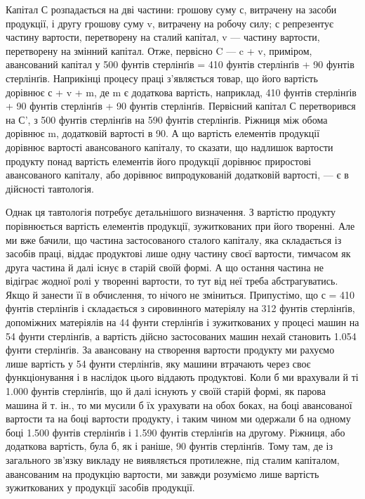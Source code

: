 Капітал С розпадається на дві частини: грошову суму с, витрачену на засоби продукції, і другу
грошову суму v, витрачену на робочу силу; с репрезентує частину вартости, перетворену на сталий
капітал, v — частину вартости, перетворену на змінний капітал. Отже, первісно C — c + v, приміром,
авансований капітал у 500 фунтів стерлінґів = 410 фунтів стерлінґів + 90 фунтів стерлінґів.
Наприкінці процесу праці з’являється товар, що його вартість дорівнює с + v + m, де m є додаткова
вартість, наприклад, 410 фунтів стерлінґів + 90 фунтів стерлінґів + 90 фунтів стерлінґів. Первісний
капітал С перетворився на С',
з 500 фунтів стерлінґів на 590 фунтів стерлінґів. Ріжниця між обома дорівнює m, додатковій вартості
в 90. А що вартість елементів продукції дорівнює вартості авансованого капіталу, то сказати, що
надлишок вартости продукту понад вартість елементів його продукції дорівнює приростові авансованого
капіталу, або дорівнює випродукованій додатковій вартості, — є в дійсності тавтологія.

Однак ця тавтологія потребує детальнішого визначення. З вартістю продукту порівнюється вартість
елементів продукції, зужиткованих при його творенні. Але ми вже бачили, що частина застосованого
сталого капіталу, яка складається із засобів праці, віддає продуктові лише одну частину своєї
вартости, тимчасом як друга частина й далі існує в старій своїй формі. А що остання частина не
відіграє жодної ролі у творенні вартости, то тут від неї треба абстрагуватись. Якщо й занести її в
обчислення, то нічого не зміниться. Припустімо, що с = 410 фунтів стерлінґів і
складається з сировинного матеріялу на 312 фунтів стерлінґів, допоміжних матеріялів на 44 фунти
стерлінґів і зужиткованих
у процесі машин на 54 фунти стерлінґів, а вартість дійсно застосованих машин нехай становить 1.054
фунти стерлінґів. За авансовану на створення вартости продукту ми рахуємо лише вартість у 54 фунти
стерлінґів, яку машини втрачають через своє функціонування і в наслідок цього віддають продуктові.
Коли б ми врахували
й ті 1.000 фунтів стерлінґів, що й далі існують у своїй старій формі, як парова машина й т. ін., то
ми мусили б їх урахувати
на обох боках, на боці авансованої вартости та на боці вартости продукту, і таким чином ми
одержали б на одному боці
1.500 фунтів стерлінґів і 1.590 фунтів стерлінґів на другому. Ріжниця, або додаткова вартість, була
б, як і раніше, 90 фунтів стерлінґів. Тому там, де із загального зв’язку викладу не виявляється
протилежне, під сталим капіталом, авансованим на продукцію
вартости, ми завжди розуміємо лише вартість зужиткованих
у продукції засобів продукції.


